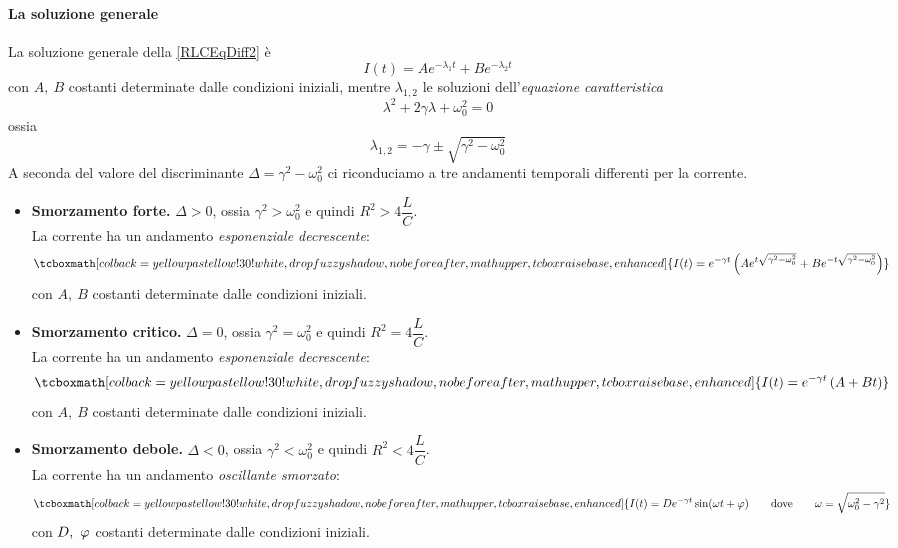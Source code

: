 \paragraph{La soluzione generale}
La soluzione generale della \eqref{RLCEqDiff2} è
\begin{equation}
	I(t)=Ae^{-\lambda_1t}+Be^{-\lambda_2t}
\end{equation}
con $A,\ B$ costanti determinate dalle condizioni iniziali, mentre $\lambda_{1,2}$ le soluzioni dell'\textit{equazione caratteristica}
\begin{equation}
	\lambda^2+2\gamma\lambda+\omega^2_0=0
\end{equation}
ossia
\begin{equation}
	\lambda_{1,2}=-\gamma\pm\sqrt{\gamma^2-\omega_0^2}
\end{equation}
A seconda del valore del discriminante $\Delta=\gamma^2-\omega_0^2$ ci riconduciamo a tre andamenti temporali differenti per la corrente.
\begin{itemize}
	\item \textbf{Smorzamento forte.} $\Delta > 0$, ossia $\gamma^2>\omega_0^2$ e quindi $R^2>4\dfrac{L}{C}$.\\
	La corrente ha un andamento \textit{esponenziale decrescente}:
	\begin{equation}
		\tcboxmath[colback=yellowpastellow!30!white,drop fuzzy shadow, nobeforeafter, math upper, tcbox raise base, enhanced]{I(t)=e^{-\gamma t}\left(A e^{t\sqrt{\gamma^2-\omega_0^2}}+B e^{-t\sqrt{\gamma^2-\omega_0^2}}\right)}
	\end{equation}
	con $A,\ B$ costanti determinate dalle condizioni iniziali.
	\item \textbf{Smorzamento critico.} $\Delta = 0$, ossia $\gamma^2=\omega_0^2$ e quindi $R^2=4\dfrac{L}{C}$.\\
	La corrente ha un andamento \textit{esponenziale decrescente}:
	\begin{equation}
		\tcboxmath[colback=yellowpastellow!30!white,drop fuzzy shadow, nobeforeafter, math upper, tcbox raise base, enhanced]{I(t)=e^{-\gamma t}\left(A+Bt\right)}
	\end{equation}
	con $A,\ B$ costanti determinate dalle condizioni iniziali.
	\item \textbf{Smorzamento debole.} $\Delta < 0$, ossia $\gamma^2<\omega_0^2$ e quindi $R^2<4\dfrac{L}{C}$.\\
	La corrente ha un andamento \textit{oscillante smorzato}:
	\begin{equation}
		\tcboxmath[colback=yellowpastellow!30!white,drop fuzzy shadow, nobeforeafter, math upper, tcbox raise base, enhanced]{I(t)=De^{-\gamma t}\sin(\omega t+\oldphi)\qquad\text{dove}\qquad\omega=\sqrt{\omega_0^2-\gamma^2}}
	\end{equation}
	con $D,\ \oldphi$ costanti determinate dalle condizioni iniziali.
\end{itemize}

